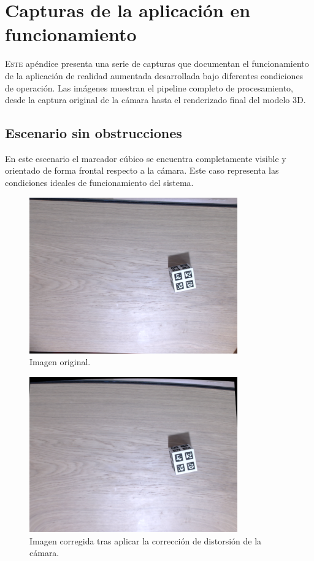\chapter{Capturas de la aplicación en funcionamiento}
\label{chap:capturas}

\lettrine{E}{ste} apéndice presenta una serie de capturas que documentan el funcionamiento de la aplicación de realidad aumentada desarrollada bajo diferentes condiciones de operación. Las imágenes muestran el pipeline completo de procesamiento, desde la captura original de la cámara hasta el renderizado final del modelo 3D.

\section{Escenario sin obstrucciones}
\label{sec:unobstructed}

En este escenario el marcador cúbico se encuentra completamente visible y orientado de forma frontal respecto a la cámara. Este caso representa las condiciones ideales de funcionamiento del sistema.

\begin{figure}[H]
	\centering
	\includegraphics[width=0.8\textwidth]{imaxes/unobstructed_raw_image.png}
	\caption{Imagen original.}
	\label{fig:unobstructed_raw}
\end{figure}

\begin{figure}[H]
	\centering
	\includegraphics[width=0.8\textwidth]{imaxes/unobstructed_undistorted.png}
	\caption{Imagen corregida tras aplicar la corrección de distorsión de la cámara.}
	\label{fig:unobstructed_undistorted}
\end{figure}

